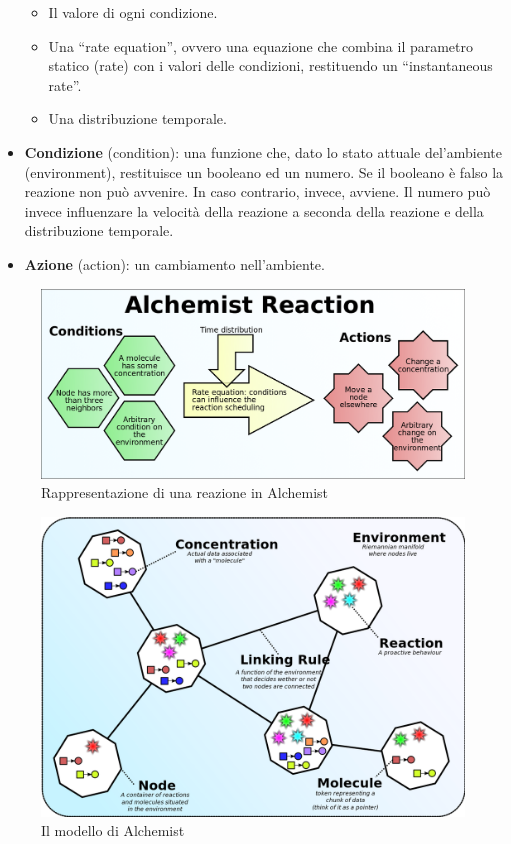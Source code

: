 \documentclass[12pt,a4paper,openright,twoside]{book}
\begin{document}
\begin{itemize}
\begin{itemize}
        \item Il valore di ogni condizione.
        \item Una “rate equation”, ovvero una equazione che combina il parametro statico (rate) con i valori delle condizioni, restituendo un “instantaneous rate”.
        \item Una distribuzione temporale.
    \end{itemize}
    \item \textbf{Condizione} (condition): una funzione che, dato lo stato attuale del'ambiente (environment), restituisce un booleano ed un numero. Se il booleano è falso la reazione non può avvenire. In caso contrario, invece, avviene. Il numero può invece influenzare la velocità della reazione a seconda della reazione e della distribuzione temporale.
    \item \textbf{Azione} (action): un cambiamento nell'ambiente.
\end{itemize}

\begin{figure}[ht]
    \centering
    \includegraphics[width=.8\linewidth]{figures/alchemistReaction.png}
    \caption{Rappresentazione di una reazione in Alchemist}\label{fig:reactionAlchemist}
\end{figure}
\begin{figure}[ht]
    \centering
    \includegraphics[width=.8\linewidth]{figures/alchemistModel.png}
    \caption{Il modello di Alchemist}\label{fig:rmodelAlchemist}
\end{figure}
\clearpage
\end{document}
